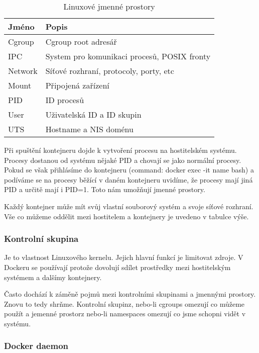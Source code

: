 \begin{table}[h!]
  \begin{center}
    \caption{Linuxové jmenné prostory}
    \label{tab:table1}
    \begin{tabular}{l|l} 
      \textbf{Jméno} & \textbf{Popis} \\
      \hline

	  Cgroup  &  Cgroup root adresář\\
	  IPC     &  System pro komunikaci procesů, POSIX fronty\\
	  Network &  Síťové rozhraní, protocoly, porty, etc\\
      Mount   &  Připojená zařízení\\
      PID     &  ID procesů\\
      User    &  Uživatelská ID a ID skupin\\
      UTS     &  Hostname a NIS doménu\\   
      
    \end{tabular}
  \end{center}
\end{table}

Při spuštění kontejneru dojde k vytvoření procesu na hostitelském systému. Procesy dostanou od systému nějaké PID a chovají se jako normální procesy. Pokud se však přihlásíme do kontejneru (command: docker exec -it name bash) a podíváme se na procesy běžící v daném kontejneru uvidíme, že procesy mají jiná PID a určitě mají i PID=1. Toto nám umožňují jmenné prostory.

Každý kontejner může mít svůj vlastní souborový systém a svoje síťové rozhraní. Vše co můžeme oddělit mezi hostitelem a kontejnery je uvedeno v tabulce výše. 

\subsubsection{Kontrolní skupina}

Je to vlastnost Linuxového kernelu. Jejich hlavní funkcí je limitovat zdroje. V Dockeru se používají protože dovolují sdílet prostředky mezi hostitelským systémem a dalšímy kontejnery. 

Často dochází k záměně pojmů mezi kontrolními skupinami a jmennými prostory. Znovu to tedy shrňme. Kontrolní skupinz, nebo-li cgroups omezují co můžeme použít a jemenné prostorz nebo-li namespaces omezují co jsme schopni vidět v systému. 

\subsubsection{Docker daemon}

